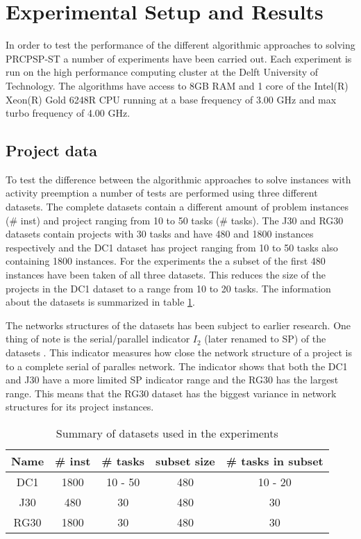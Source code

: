 \section{Experimental Setup and Results}
In order to test the performance of the different algorithmic approaches to solving PRCPSP-ST a number of experiments have been carried out.
Each experiment is run on the high performance computing cluster at the Delft University of Technology. The algorithms have access to 8GB RAM and 1 core of the Intel(R) Xeon(R) Gold 6248R CPU running at a base frequency of 3.00 GHz and max turbo frequency of 4.00 GHz.

\subsection{Project data}
To test the difference between the algorithmic approaches to solve instances with activity preemption a number of tests are performed using three different datasets. The complete datasets contain a different amount of problem instances (\# inst) and project ranging from 10 to 50 tasks (\# tasks). The J30 and RG30 datasets contain projects with 30 tasks and have 480 and 1800 instances respectively and the DC1 dataset has project ranging from 10 to 50 tasks also containing 1800 instances. For the experiments the a subset of the first 480 instances have been taken of all three datasets. This reduces the size of the projects in the DC1 dataset to a range from 10 to 20 tasks. The information about the datasets is summarized in table \ref{table:table1}.

The networks structures of the datasets has been subject to earlier research. One thing of note is the serial/parallel indicator \(I_2\) (later renamed to SP) of the datasets \cite{RN65,RN63}. This indicator measures how close the network structure of a project is to a complete serial of paralles network. The indicator shows that both the DC1 and J30 have a more limited SP indicator range and the RG30 has the largest range. This means that the RG30 dataset has the biggest variance in network structures for its project instances.

\begin{table}
	\begin{center}
		\caption{Summary of datasets used in the experiments}
		\label{table:table1}
		\begin{tabular}{ c | c c c c }
			Name & \# inst & \# tasks & subset size & \# tasks in subset \\
			\hline
			DC1 & 1800 & 10 - 50 & 480 & 10 - 20 \\
			J30 & 480 & 30 & 480 & 30 \\
			RG30 & 1800 & 30 & 480 & 30
		\end{tabular}
	\end{center}
\end{table}


